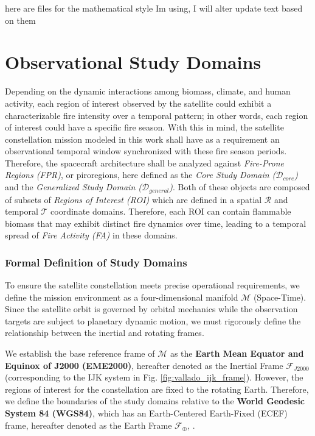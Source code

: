 here are files for the mathematical style Im using, I will alter update text based on them 



\section{Observational Study Domains} \label{sec:obs_domains}



Depending on the dynamic interactions among biomass, climate, and human activity, each region of interest observed by the satellite could exhibit a characterizable fire intensity over a temporal pattern; in other words, each region of interest could have a specific fire season. With this in mind, the satellite constellation mission modeled in this work shall have as a requirement an observational temporal window synchronized with these fire season periods. Therefore, the spacecraft architecture shall be analyzed against\textit{ Fire-Prone Regions (FPR)}, or piroregions, here defined as the \textit{Core Study Domain ($\mathcal{D}_{core}$)} and the \textit{Generalized Study Domain ($\mathcal{D}_{general}$)}. Both of these objects are composed of subsets of \textit{Regions of Interest (ROI)} which are defined in a spatial $\mathcal{R}$ and temporal $\mathcal{T}$ coordinate domains. Therefore, each ROI can contain flammable biomass that may exhibit distinct fire dynamics over time, leading to a temporal spread of \textit{Fire Activity (FA)} in these domains. 



\subsubsection{Formal Definition of Study Domains}\label{sec:formal_def_domains}



To ensure the satellite constellation meets precise operational requirements, we define the mission environment as a four-dimensional manifold $\mathcal{M}$ (Space-Time). Since the satellite orbit is governed by orbital mechanics while the observation targets are subject to planetary dynamic motion, we must rigorously define the relationship between the inertial and rotating frames.



We establish the base reference frame of $\mathcal{M}$ as the \textbf{Earth Mean Equator and Equinox of J2000 (EME2000)}, hereafter denoted as the Inertial Frame $\mathcal{F}_{J2000}$ (corresponding to the IJK system in Fig. \ref{fig:vallado_ijk_frame}). However, the regions of interest for the constellation are fixed to the rotating Earth. Therefore, we define the boundaries of the study domains relative to the \textbf{World Geodesic System 84 (WGS84)}, which has an Earth-Centered Earth-Fixed (ECEF) frame, hereafter denoted as the Earth Frame $\mathcal{F}_{\oplus}$, .


